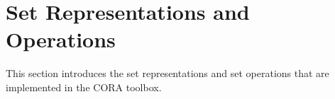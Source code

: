 
\section{Set Representations and Operations}
\label{sec:setRepresentationsAndOperations}

This section introduces the set representations and set operations that are implemented in the CORA toolbox.



\newpage

